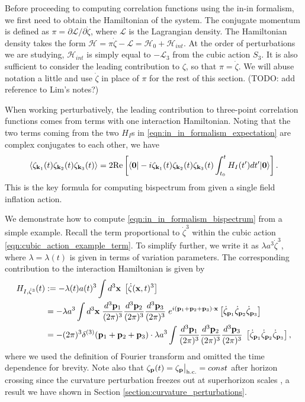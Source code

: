 Before proceeding to computing correlation functions using the in-in formalism, we first need to obtain the Hamiltonian of the system. The conjugate momentum is defined as $\pi = \partial \mathcal{L} / \partial \dot{\zeta}$, where $\mathcal{L}$ is the Lagrangian density. The Hamiltonian density takes the form $\mathcal{H} = \pi \dot{\zeta} - \mathcal{L} = \mathcal{H}_0 + \mathcal{H}_{int}$. At the order of perturbations we are studying, $\mathcal{H}_{int}$ is simply equal to $-\mathcal{L}_3$ from the cubic action $S_3$. It is also sufficient to consider the leading contribution to $\zeta$, so that $\pi=\dot{\zeta}$. We will abuse notation a little and use $\dot{\zeta}$ in place of $\pi$ for the rest of this section. (TODO: add reference to Lim's notes?)

When working perturbatively, the leading contribution to three-point correlation functions comes from terms with one interaction Hamiltonian. Noting that the two terms coming from the two $H_I$s in \eqref{eqn:in_in_formalism_expectation} are complex conjugates to each other, we have
\begin{align}
	\left< \zeta_{\mathbf{k}_1}(t) \zeta_{\mathbf{k}_2}(t) \zeta_{\mathbf{k}_3}(t) \right> = 2 \text{Re}\left[ \langle\mathbf{0}| -i \zeta_{\mathbf{k}_1}(t) \zeta_{\mathbf{k}_2}(t) \zeta_{\mathbf{k}_3}(t) \int_{t_0}^{t} H_I(t') dt' |\mathbf{0}\rangle \right]. \label{eqn:in_in_formalism_bispectrum}
\end{align}
This is the key formula for computing bispectrum from given a single field inflation action.

We demonstrate how to compute \eqref{eqn:in_in_formalism_bispectrum} from a simple example. Recall the term proportional to $\dot\zeta^3$ within the cubic action \eqref{eqn:cubic_action_example_term}. To simplify further, we write it as $\lambda a^3 \dot{\zeta}^3$, where $\lambda=\lambda(t)$ is given in terms of variation parameters. The corresponding contribution to the interaction Hamiltonian is given by
\begin{align}
	H_{I,\dot{\zeta}^3}(t) &:= -\lambda(t) a(t)^3 \int d^3\mathbf{x} \; \left[  \dot{\zeta}(\mathbf{x},t)^3 \right]  \\
	&= -\lambda a^3 \int d^3\mathbf{x} \; \frac{d^3\mathbf{p}_1}{(2\pi)^3} \frac{d^3\mathbf{p}_2}{(2\pi)^3} \frac{d^3\mathbf{p}_3}{(2\pi)^3} \; e^{i(\mathbf{p}_1 + \mathbf{p}_2 + \mathbf{p}_3)\cdot\mathbf{x}} \left[ \dot{\zeta}_{\mathbf{p}_1} \dot{\zeta}_{\mathbf{p}_2} \dot{\zeta}_{\mathbf{p}_3} \right] \\
	&= - (2\pi)^3 \delta^{(3)}(\mathbf{p}_1 + \mathbf{p}_2 + \mathbf{p}_3) \cdot \lambda a^3 \int \frac{d^3\mathbf{p}_1}{(2\pi)^3} \frac{d^3\mathbf{p}_2}{(2\pi)^3} \frac{d^3\mathbf{p}_3}{(2\pi)^3} \; \left[ \dot{\zeta}_{\mathbf{p}_1} \dot{\zeta}_{\mathbf{p}_2} \dot{\zeta}_{\mathbf{p}_3} \right], \label{def:interaction_hamiltonian_zeta_dot_cube}
\end{align}
where we used the definition of Fourier transform and omitted the time dependence for brevity. Note also that $\zeta_{\mathbf{p}}(t) = \zeta_{\mathbf{p}}\bigr|_ \text{h.c.} = const$ after horizon crossing since the curvature perturbation freezes out at superhorizon scales , a result we have shown in Section \ref{section:curvature_perturbations}.

